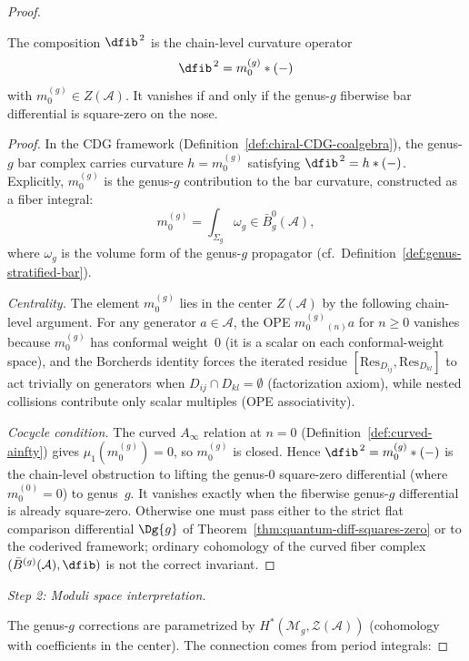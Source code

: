 \begin{proof}
\begin{lemma}\label{lem:obstruction-class}
The composition $\dfib^{\,2}$ is the chain-level curvature operator
\[
\dfib^{\,2} = m_0^{(g)} \ast (-)
\]
with $m_0^{(g)} \in Z(\mathcal{A})$. It vanishes if and only if the
genus-$g$ fiberwise bar differential is square-zero on the nose.
\end{lemma}

\begin{proof}
In the CDG framework (Definition~\ref{def:chiral-CDG-coalgebra}), the genus-$g$
bar complex carries curvature $h = m_0^{(g)}$ satisfying $\dfib^{\,2} = h \ast (-)$.
Explicitly, $m_0^{(g)}$ is the genus-$g$ contribution to the bar curvature,
constructed as a fiber integral:
\[
m_0^{(g)} = \int_{\Sigma_g} \omega_g \in \bar{B}^0_g(\mathcal{A}),
\]
where $\omega_g$ is the volume form of the genus-$g$ propagator
(cf.\ Definition~\ref{def:genus-stratified-bar}).

\emph{Centrality.}
The element $m_0^{(g)}$ lies in the center $Z(\mathcal{A})$ by the
following chain-level argument. For any generator $a \in \mathcal{A}$,
the OPE $m_0^{(g)}{}_{(n)} a$ for $n \geq 0$ vanishes because $m_0^{(g)}$
has conformal weight~$0$ (it is a scalar on each conformal-weight space),
and the Borcherds identity forces the iterated residue
$[\mathrm{Res}_{D_{ij}}, \mathrm{Res}_{D_{kl}}]$ to act trivially on
generators when $D_{ij} \cap D_{kl} = \emptyset$ (factorization axiom),
while nested collisions contribute only scalar multiples (OPE associativity).

\emph{Cocycle condition.}
The curved $A_\infty$ relation at $n=0$
(Definition~\ref{def:curved-ainfty}) gives
$\mu_1(m_0^{(g)}) = 0$, so $m_0^{(g)}$ is closed. Hence
$\dfib^{\,2} = m_0^{(g)} \ast (-)$ is the chain-level obstruction to
lifting the genus-$0$ square-zero differential (where $m_0^{(0)} = 0$)
to genus~$g$. It vanishes exactly when the fiberwise genus-$g$
differential is already square-zero. Otherwise one must pass either to
the strict flat comparison differential $\Dg{g}$ of
Theorem~\ref{thm:quantum-diff-squares-zero} or to the coderived
framework; ordinary cohomology of the curved fiber complex
$(\bar{B}^{(g)}(\mathcal{A}), \dfib)$ is not the correct invariant.
\end{proof}

\emph{Step 2: Moduli space interpretation.}

The genus-$g$ corrections are parametrized by $H^*(\mathcal{M}_g, \mathcal{Z}(\mathcal{A}))$ (cohomology with coefficients in the center). The connection comes from period integrals:


\end{proof}
